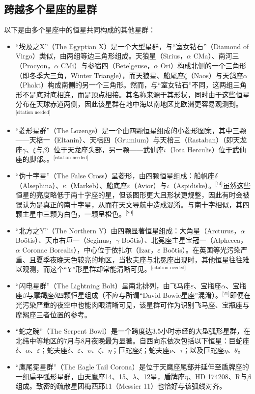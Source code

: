 \subsection{跨越多个星座的星群}
以下是由多个星座中的恒星共同构成的其他星群：
\begin{itemize}
\item “埃及之X”（The Egyptian X）是一个大型星群，与“室女钻石”（Diamond of Virgo）类似，由两组等边三角形组成。天狼星（Sirius，$\alpha$ CMa）、南河三（Procyon，$\alpha$ CMi）与参宿四（Betelgeuse，$\alpha$ Ori）构成北侧的一个三角形（即冬季大三角，Winter Triangle），而天狼星、船尾座$\zeta$（Naos）与天鸽座$\alpha$（Phakt）构成南侧的另一个三角形。然而，与“室女钻石”不同，这两组三角形不是底对底相连，而是顶点相接。其名称来源于其形状，同时由于这些恒星分布在天球赤道两侧，因此该星群在地中海以南地区比欧洲更容易观测到。\(^\text{[citation needed]}\)
\item “菱形星群”（The Lozenge）是一个由四颗恒星组成的小菱形图案，其中三颗——天棓一（Eltanin）、天棓四（Grumium）与天棓三（Rastaban）（即天龙座$\gamma$、$\xi$与$\beta$）位于天龙座头部，另一颗——武仙座$\iota$（Iota Herculis）位于武仙座的脚部。。\(^\text{[citation needed]}\)
\item “伪十字星”（The False Cross）呈菱形，由四颗恒星组成：船帆座$\delta$（Alsephina）、$\kappa$（Markeb）、船底座$\varepsilon$（Avior）与$\iota$（Aspidiske）。\(^\text{[14]}\)虽然这些恒星的亮度略低于南十字座的星，但该图形更大且形状更规整，因此有时会被误认为是真正的南十字星，从而在天文导航中造成混淆。与南十字相似，其四颗主星中三颗为白色，一颗呈橙色。\(^\text{[20]}\)
\item “北方之Y”（The Northern Y）由四颗显著恒星组成：大角星（Arcturus，$\alpha$ Boötis）、天市右垣一（Seginus，$\gamma$ Boötis）、北冕座主星宝冠一（Alphecca，$\alpha$ Coronae Borealis），中心位于依扎尔（Izar，$\varepsilon$ Boötis）。在英国等光污染严重、且夏季夜晚天色较亮的地区，当牧夫座与北冕座出现时，其他恒星往往难以观测，而这个“Y”形星群却常能清晰可见。\(^\text{[citation needed]}\)
\item “闪电星群”（The Lightning Bolt）呈南北排列，由飞马座$\varepsilon$、宝瓶座$\alpha$、宝瓶座$\beta$与摩羯座$\delta$四颗恒星组成（不应与所谓“David Bowie星座”混淆）。\(^\text{[21]}\)即便在光污染严重的夜空中也能肉眼清晰可见，该星群可作为识别飞马座、宝瓶座与摩羯座三者位置的参考。
\item “蛇之碗”（The Serpent Bowl）是一个跨度达3.5小时赤经的大型弧形星群，在北纬中等地区的7月与8月夜晚最为显著。自西向东依次包括以下恒星：巨蛇座$\delta$、$\alpha$、$\varepsilon$；蛇夫座$\delta$、$\varepsilon$、$\upsilon$、$\zeta$、$\eta$；巨蛇座$\xi$；蛇夫座$\nu$、$\tau$；以及巨蛇座$\eta$、$\theta$。
\item “鹰尾冕星群”（The Eagle Tail Corona）是位于天鹰座尾部并延伸至盾牌座的一组扁平弧形星群，由天鹰座14、15、$\lambda$、12星，盾牌座$\eta$、HD 174208、R与$\beta$组成。致密的疏散星团梅西耶11（Messier 11）也恰好与该弧线对齐。
\end{itemize}
